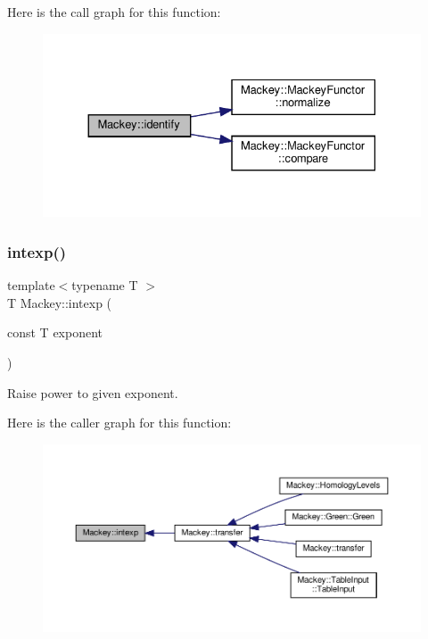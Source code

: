 Here is the call graph for this function\+:\nopagebreak
\begin{figure}[H]
\begin{center}
\leavevmode
\includegraphics[width=330pt]{namespaceMackey_a216f2d9a39510ce4513d5d8a576adc43_cgraph}
\end{center}
\end{figure}
\mbox{\label{namespaceMackey_a4904fdc0fdcf3c23d7f3b80f59b2eafa}} 
\subsubsection{\texorpdfstring{intexp()}{intexp()}}
{\footnotesize\ttfamily template$<$typename T $>$ \\
T Mackey\+::intexp (\begin{DoxyParamCaption}\item[{const T}]{exponent }\end{DoxyParamCaption})\hspace{0.3cm}{\ttfamily [inline]}}



Raise power to given exponent. 

Here is the caller graph for this function\+:\nopagebreak
\begin{figure}[H]
\begin{center}
\leavevmode
\includegraphics[width=350pt]{namespaceMackey_a4904fdc0fdcf3c23d7f3b80f59b2eafa_icgraph}
\end{center}
\end{figure}
\mbox{\label{namespaceMackey_aa0cac9097035c5fe8448742e22e6f78b}} 
